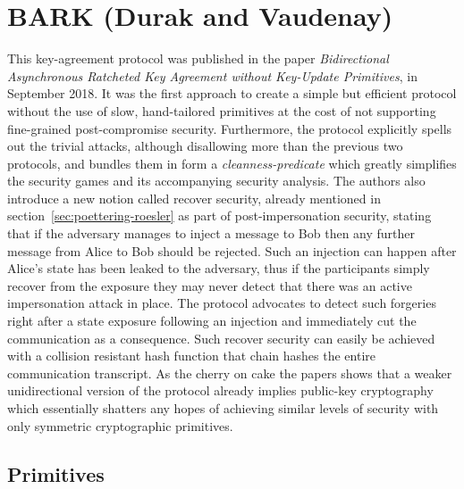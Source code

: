 \documentclass[11pt,a4paper,twoside,openright,bibliography=totoc]{scrbook}
\begin{document}
\clearpage

\section[Durak and Vaudenay]
{BARK (Durak and Vaudenay)~\cite{durak2018bidirectional}}
\label{sec:durak-vaudenay}

This key-agreement protocol was published in the paper
\textit{Bidirectional Asynchronous Ratcheted Key Agreement without
Key-Update Primitives}, in September 2018. It was the first approach to
create a simple but efficient protocol without the use of slow,
hand-tailored primitives at the cost of not supporting fine-grained
post-compromise security. Furthermore, the protocol explicitly spells
out the trivial attacks, although disallowing more than the previous
two protocols, and bundles them in form a \textit{cleanness-predicate}
which greatly simplifies the security games and its accompanying
security analysis. The authors also introduce a new notion called
recover security, already mentioned in section~\ref{sec:poettering-roesler}
as part of post-impersonation security,
stating that if the adversary manages to inject a message to Bob
then any further message from Alice to Bob should be rejected.
Such an injection can happen after Alice's state has been leaked to the adversary,
thus if the participants simply recover from the exposure they may
never detect that there was an active impersonation attack in place.
The protocol advocates to detect such forgeries right after a
state exposure following an injection and immediately cut the communication as a
consequence. Such recover security can easily be achieved with a
collision resistant hash function that chain hashes the entire
communication transcript. As the cherry on cake the papers shows that
a weaker unidirectional version of the protocol already implies
public-key cryptography which essentially shatters any hopes of
achieving similar levels of security with only symmetric
cryptographic primitives.

\subsection{Primitives}
\label{sec:primitives-2}
\end{document}
